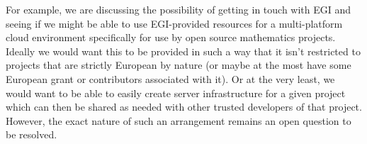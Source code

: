 \documentclass{deliverablereport}
\begin{document}
For example, we are discussing the possibility of getting in touch with EGI and
seeing if we might be able to use EGI-provided resources for a multi-platform
cloud environment specifically for use by open source mathematics projects.
Ideally we would want this to be provided in such a way that it isn't
restricted to projects that are strictly European by nature (or maybe at the
most have some European grant or contributors associated with it).  Or at the
very least, we would want to be able to easily create server infrastructure
for a given project which can then be shared as needed with other trusted
developers of that project.  However, the exact nature of such an arrangement
remains an open question to be resolved.
\end{document}
